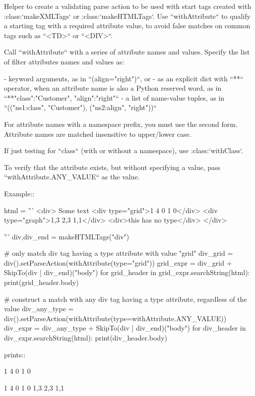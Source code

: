 \begin{DoxyVerb}Helper to create a validating parse action to be used with start
tags created with :class:`makeXMLTags` or
:class:`makeHTMLTags`. Use ``withAttribute`` to qualify
a starting tag with a required attribute value, to avoid false
matches on common tags such as ``<TD>`` or ``<DIV>``.

Call ``withAttribute`` with a series of attribute names and
values. Specify the list of filter attributes names and values as:

 - keyword arguments, as in ``(align="right")``, or
 - as an explicit dict with ``**`` operator, when an attribute
   name is also a Python reserved word, as in ``**{"class":"Customer", "align":"right"}``
 - a list of name-value tuples, as in ``(("ns1:class", "Customer"), ("ns2:align", "right"))``

For attribute names with a namespace prefix, you must use the second
form.  Attribute names are matched insensitive to upper/lower case.

If just testing for ``class`` (with or without a namespace), use
:class:`withClass`.

To verify that the attribute exists, but without specifying a value,
pass ``withAttribute.ANY_VALUE`` as the value.

Example::

    html = '''
        <div>
        Some text
        <div type="grid">1 4 0 1 0</div>
        <div type="graph">1,3 2,3 1,1</div>
        <div>this has no type</div>
        </div>

    '''
    div,div_end = makeHTMLTags("div")

    # only match div tag having a type attribute with value "grid"
    div_grid = div().setParseAction(withAttribute(type="grid"))
    grid_expr = div_grid + SkipTo(div | div_end)("body")
    for grid_header in grid_expr.searchString(html):
        print(grid_header.body)

    # construct a match with any div tag having a type attribute, regardless of the value
    div_any_type = div().setParseAction(withAttribute(type=withAttribute.ANY_VALUE))
    div_expr = div_any_type + SkipTo(div | div_end)("body")
    for div_header in div_expr.searchString(html):
        print(div_header.body)

prints::

    1 4 0 1 0

    1 4 0 1 0
    1,3 2,3 1,1
\end{DoxyVerb}
 \mbox{\label{namespacepip_1_1__vendor_1_1pyparsing_a060b8574c0f73cc120aeb38aeb1f18a2}} 
